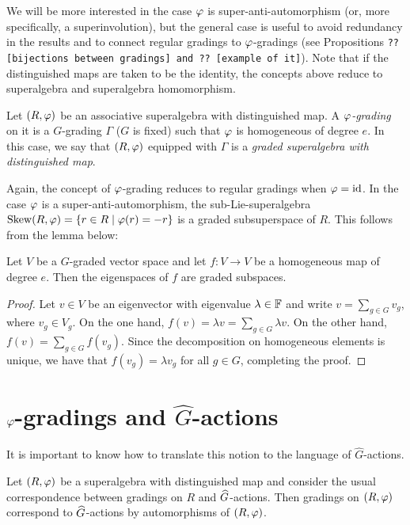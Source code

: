We will be more interested in the case $\varphi$ is super-anti-automorphism (or, more specifically, a superinvolution), but the general case is useful to avoid redundancy in the results and to connect regular gradings to $\varphi$-gradings (see Propositions \texttt{?? [bijections between gradings]  and ?? [example of it]}). Note that if the distinguished maps are taken to be the identity, the concepts above reduce to superalgebra and superalgebra homomorphism.

\begin{defi}
	Let $(R, \varphi)$ be an associative superalgebra with distinguished map. A \emph{$\varphi$-grading} on it is a $G$-grading $\Gamma$ ($G$ is fixed) such that $\varphi$ is homogeneous of degree $e$. In this case, we say that $(R, \varphi)$ equipped with $\Gamma$ is a \emph{graded superalgebra with distinguished map}.
\end{defi}

Again, the concept of $\varphi$-grading reduces to regular gradings when $\varphi = \operatorname{id}$. In the case $\varphi$ is a super-anti-automorphism, the sub-Lie-superalgebra $\operatorname{Skew} (R, \varphi) = \{ r\in R \mid \varphi(r) = -r \}$ is a graded subsuperspace of $R$. This follows from the lemma below:

\begin{lemma}
	Let $V$ be a $G$-graded vector space and let $f: V \to V$ be a homogeneous map of degree $e$. Then the eigenspaces of $f$ are graded subspaces.
\end{lemma}

\begin{proof}
	Let $v\in V$ be an eigenvector with eigenvalue $\lambda \in \mathbb{F}$ and write $v = \sum_{g\in G} v_g$, where $v_g \in V_g$. On the one hand, $f(v) = \lambda v = \sum_{g\in G} \lambda v$. On the other hand, $f(v) = \sum_{g\in G} f(v_g)$. Since the decomposition on homogeneous elements is unique, we have that $f(v_g) = \lambda v_g$ for all $g\in G$, completing the proof.
\end{proof}

\section{$\varphi$-gradings and $\widehat G$-actions}

It is important to know how to translate this notion to the language of $\widehat G$-actions.

\begin{prop}
	Let $(R, \varphi)$ be a superalgebra with distinguished map and consider the usual correspondence between gradings on $R$ and $\widehat G$-actions. Then gradings on $(R, \varphi)$ correspond to $\widehat G$-actions by automorphisms of $(R, \varphi)$.
\end{prop}

